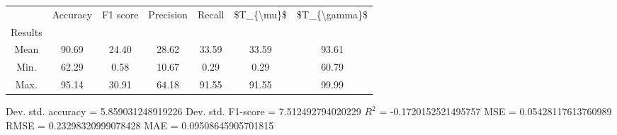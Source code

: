 \begin{tabular}{|c|c|c|c|c|c|c|}
\toprule
{} &  Accuracy &  F1 score &  Precision &  Recall &  \$T\_\{\textbackslash mu\}\$ &  \$T\_\{\textbackslash gamma\}\$ \\
Results &           &           &            &         &            &               \\
\hline
Mean    &     90.69 &     24.40 &      28.62 &   33.59 &      33.59 &         93.61 \\
Min.    &     62.29 &      0.58 &      10.67 &    0.29 &       0.29 &         60.79 \\
Max.    &     95.14 &     30.91 &      64.18 &   91.55 &      91.55 &         99.99 \\
\bottomrule
\end{tabular}

 Dev. std. accuracy = 5.859031248919226
 Dev. std. F1-score = 7.512492794020229
 $R^2$ = -0.1720152521495757
 MSE = 0.05428117613760989
 RMSE = 0.23298320999078428
 MAE = 0.09508645905701815